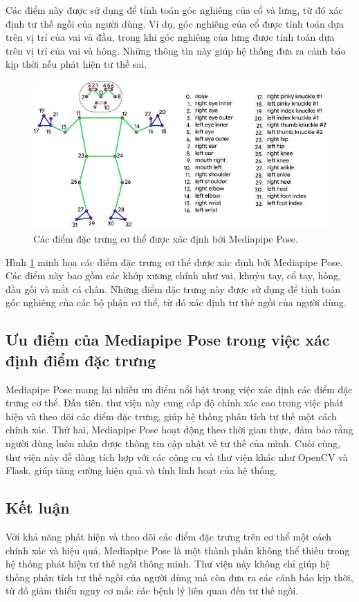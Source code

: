 \documentclass[conference]{IEEEtran}
\begin{document}
Các điểm này được sử dụng để tính toán góc nghiêng của cổ và lưng, từ đó xác định tư thế ngồi của người dùng. Ví dụ, góc nghiêng của cổ được tính toán dựa trên vị trí của vai và đầu, trong khi góc nghiêng của lưng được tính toán dựa trên vị trí của vai và hông. Những thông tin này giúp hệ thống đưa ra cảnh báo kịp thời nếu phát hiện tư thế sai.

\begin{figure}[H]
    \centering
    \includegraphics[width=0.8\linewidth]{images/body_keypoints.png}
    \caption{Các điểm đặc trưng cơ thể được xác định bởi Mediapipe Pose.}
    \label{fig:body_keypoints}
\end{figure}

Hình \ref{fig:body_keypoints} minh họa các điểm đặc trưng cơ thể được xác định bởi Mediapipe Pose. Các điểm này bao gồm các khớp xương chính như vai, khuỷu tay, cổ tay, hông, đầu gối và mắt cá chân. Những điểm đặc trưng này được sử dụng để tính toán góc nghiêng của các bộ phận cơ thể, từ đó xác định tư thế ngồi của người dùng.

\subsection{Ưu điểm của Mediapipe Pose trong việc xác định điểm đặc trưng}
Mediapipe Pose mang lại nhiều ưu điểm nổi bật trong việc xác định các điểm đặc trưng cơ thể. Đầu tiên, thư viện này cung cấp độ chính xác cao trong việc phát hiện và theo dõi các điểm đặc trưng, giúp hệ thống phân tích tư thế một cách chính xác. Thứ hai, Mediapipe Pose hoạt động theo thời gian thực, đảm bảo rằng người dùng luôn nhận được thông tin cập nhật về tư thế của mình. Cuối cùng, thư viện này dễ dàng tích hợp với các công cụ và thư viện khác như OpenCV và Flask, giúp tăng cường hiệu quả và tính linh hoạt của hệ thống.

\subsection{Kết luận}
Với khả năng phát hiện và theo dõi các điểm đặc trưng trên cơ thể một cách chính xác và hiệu quả, Mediapipe Pose là một thành phần không thể thiếu trong hệ thống phát hiện tư thế ngồi thông minh. Thư viện này không chỉ giúp hệ thống phân tích tư thế ngồi của người dùng mà còn đưa ra các cảnh báo kịp thời, từ đó giảm thiểu nguy cơ mắc các bệnh lý liên quan đến tư thế ngồi.
\end{document}
